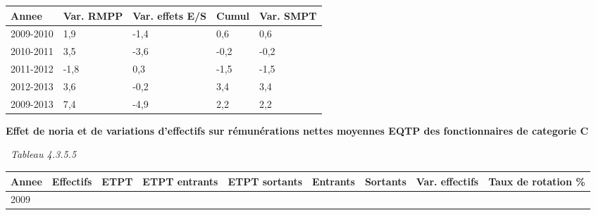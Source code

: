 \begin{longtable}[]{@{}lllll@{}}
\toprule
Annee & Var. RMPP & Var. effets E/S & Cumul & Var. SMPT\tabularnewline
\midrule
\endhead
2009-2010 & 1,9 & -1,4 & 0,6 & 0,6\tabularnewline
2010-2011 & 3,5 & -3,6 & -0,2 & -0,2\tabularnewline
2011-2012 & -1,8 & 0,3 & -1,5 & -1,5\tabularnewline
2012-2013 & 3,6 & -0,2 & 3,4 & 3,4\tabularnewline
2009-2013 & 7,4 & -4,9 & 2,2 & 2,2\tabularnewline
\bottomrule
\end{longtable}

\textbf{Effet de noria et de variations d'effectifs sur rémunérations
nettes moyennes EQTP des fonctionnaires de categorie C}

~\emph{Tableau 4.3.5.5}

\begin{longtable}[]{@{}lllllllll@{}}
\toprule
\begin{minipage}[b]{0.05\columnwidth}\raggedright
Annee\strut
\end{minipage} & \begin{minipage}[b]{0.08\columnwidth}\raggedright
Effectifs\strut
\end{minipage} & \begin{minipage}[b]{0.05\columnwidth}\raggedright
ETPT\strut
\end{minipage} & \begin{minipage}[b]{0.10\columnwidth}\raggedright
ETPT entrants\strut
\end{minipage} & \begin{minipage}[b]{0.10\columnwidth}\raggedright
ETPT sortants\strut
\end{minipage} & \begin{minipage}[b]{0.07\columnwidth}\raggedright
Entrants\strut
\end{minipage} & \begin{minipage}[b]{0.07\columnwidth}\raggedright
Sortants\strut
\end{minipage} & \begin{minipage}[b]{0.11\columnwidth}\raggedright
Var. effectifs\strut
\end{minipage} & \begin{minipage}[b]{0.14\columnwidth}\raggedright
Taux de rotation \%\strut
\end{minipage}\tabularnewline
\midrule
\endhead
\begin{minipage}[t]{0.05\columnwidth}\raggedright
2009\strut
\end{minipage} & \begin{minipage}[t]{0.08\columnwidth}\raggedright

\end{minipage}
\end{longtable}
